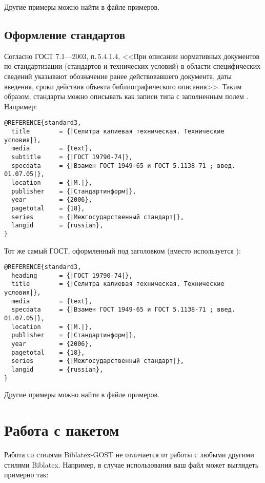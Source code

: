 \documentclass[10pt,a4paper,headings=small,numbers=enddot,english,russian]{ltxdockit}
\newcommand*{\biblatex}{Biblatex\xspace}
\newcommand*{\biblatexgost}{Biblatex-GOST\xspace}
\newcommand*{\gostbibname}[1][]{ГОСТ#1 7.1---2003\xspace}
\newcommand*{\gostbibref}[2][]{\gostbibname[#1], п.\,#2\xspace}
\begin{document}
Другие примеры можно найти в файле примеров.

\subsection{Оформление стандартов}
\label{sec:standards}

Согласно \gostbibref{5.4.1.4},
<<При описании нормативных документов по стандартизации (стандартов и технических
условий) в области специфических сведений указывают обозначение ранее действовавшего документа,
даты введения, сроки действия объекта библиографического описания>>.
Таким образом, стандарты можно описывать как записи типа  с
заполненным полем . Например:

\begin{lstlisting}[style=bibtex,escapechar=|]
@REFERENCE{standard3,
  title        = {|Селитра калиевая техническая. Технические условия|},
  media        = {text},
  subtitle     = {|ГОСТ 19790-74|},
  specdata     = {|Взамен ГОСТ 1949-65 и ГОСТ 5.1138-71 ; введ. 01.07.05|},
  location     = {|М.|},
  publisher    = {|Стандартинформ|},
  year         = {2006},
  pagetotal    = {18},
  series       = {|Межгосударственный стандарт|},
  langid       = {russian},
}
\end{lstlisting}

Тот же самый ГОСТ, оформленный под заголовком (вместо 
используется ):

\begin{lstlisting}[style=bibtex,escapechar=|]
@REFERENCE{standard3,
  heading      = {|ГОСТ 19790-74|},
  title        = {|Селитра калиевая техническая. Технические условия|},
  media        = {text},
  specdata     = {|Взамен ГОСТ 1949-65 и ГОСТ 5.1138-71 ; введ. 01.07.05|},
  location     = {|М.|},
  publisher    = {|Стандартинформ|},
  year         = {2006},
  pagetotal    = {18},
  series       = {|Межгосударственный стандарт|},
  langid       = {russian},
}
\end{lstlisting}

Другие примеры можно найти в файле примеров.

\section{Работа с пакетом}
\label{sec:usage}

Работа со стилями \biblatexgost не отличается от работы с любыми другими стилями
\biblatex. Например, в случае использования  ваш
файл \latex может выглядеть примерно так:
\end{document}

